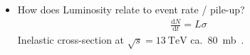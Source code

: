 \begin{itemize}
\item How does Luminosity relate to event rate / pile-up?
  \begin{align*}
    \frac{\mathrm{d}N}{\mathrm{d}t} = L \sigma
  \end{align*}
  Inelastic \pp cross-section at $\sqrt{s} = \SI{13}{\TeV}$ ca.\
  \SI{80}{\milli\barn}~\cite{STDM-2015-05}.

\end{itemize}


